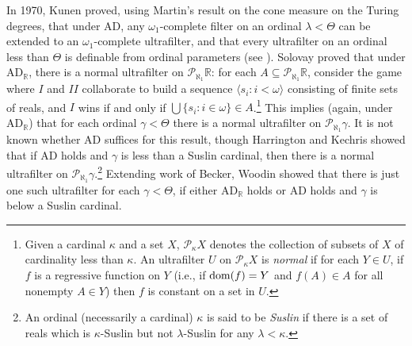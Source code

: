 \documentclass{book}%
\def\undertilde#1{{\baselineskip=0pt\vtop
  {\hbox{$#1$}\hbox{$\scriptscriptstyle\sim$}}}{}}
\newcommand{\dom}{{\rm dom}}
\begin{document}
In 1970, Kunen proved, using Martin's result on
the cone measure on the Turing degrees,
that under AD, any $\omega_{1}$-complete filter on an ordinal
$\lambda < \Theta$ can be extended to an $\omega_{1}$-complete
ultrafilter, and that every
ultrafilter on an ordinal less than $\Theta$ is definable from ordinal parameters (see \cite[pp.~399-400]{Kanamori}). Solovay  proved that under
AD$_{\mathbb{R}}$, there is a normal ultrafilter on
$\mathcal{P}_{\aleph_{1}}\mathbb{R}$: for each $A \subseteq \mathcal{P}_{\aleph_{1}}\mathbb{R}$,
consider the game where $I$ and $II$ collaborate to build a sequence $\langle s_{i} : i < \omega \rangle$ consisting of finite sets of reals, and $I$ wins if and only if
$\bigcup\{ s_{i} : i \in \omega\} \in A$.\footnote{Given a cardinal $\kappa$ and a set $X$,
$\mathcal{P}_{\kappa} X $
denotes the collection of subsets of $X$ of cardinality less than $\kappa$.  An ultrafilter $U$ on $\mathcal{P}_{\kappa} X$ is \emph{normal} if
for each $Y \in U$, if $f$ is a regressive function on $Y$ (i.e., if $\dom(f) = Y$ and $f(A) \in A$ for all nonempty $A \in Y$) then
$f$ is constant on a set in $U$.} This implies (again, under AD$_{\mathbb{R}}$) that for each ordinal $\gamma < \Theta$ there is a normal ultrafilter on
$\mathcal{P}_{\aleph_{1}} \gamma$. It
is not known whether AD suffices for this result, though Harrington and Kechris  showed that if AD holds and $\gamma$ is less than a Suslin cardinal,
then there is a normal ultrafilter on $\mathcal{P}_{\aleph_{1}} \gamma$.\footnote{An ordinal (necessarily a cardinal) $\kappa$ is said to be \emph{Suslin} if there is a set of reals which is $\kappa$-Suslin
but not $\lambda$-Suslin for any $\lambda < \kappa$.}
Extending work of Becker, Woodin
 showed that there is just one such
ultrafilter for each $\gamma < \Theta$, if either AD$_{\mathbb{R}}$ holds or AD holds and $\gamma$ is below a Suslin cardinal.


\end{document}
